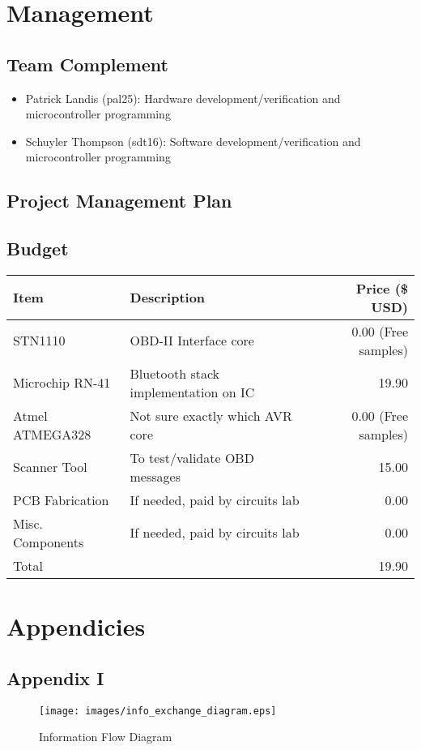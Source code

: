 \documentclass[12pt,letterpaper]{article}
\begin{document}
\section{Management}
\subsection{Team Complement}
\begin{itemize}
	\item Patrick Landis (pal25): Hardware development/verification and microcontroller programming

	\item Schuyler Thompson (sdt16): Software development/verification and microcontroller programming
\end{itemize}

\subsection{Project Management Plan}



\subsection{Budget}
\begin{tabular}{| l | p{7cm} | r |}
\hline
Item & Description & Price (\$ USD) \\ \hline
STN1110 & OBD-II Interface core & 0.00 (Free samples) \\ \hline
Microchip RN-41 & Bluetooth stack implementation on IC & 19.90 \\ \hline
Atmel ATMEGA328 & Not sure exactly which AVR core & 0.00 (Free samples) \\ \hline
Scanner Tool & To test/validate OBD messages & 15.00 \\ \hline
PCB Fabrication & If needed, paid by circuits lab & 0.00 \\ \hline
Misc. Components & If needed, paid by circuits lab & 0.00 \\ \hline
\hline
Total && 19.90 \\ \hline
\end{tabular}

\newpage

\section{Appendicies}
\subsection{Appendix I}
\begin{figure}[!ht]
\centering
\texttt{[image: images/info\_exchange\_diagram.eps]}
\caption{Information Flow Diagram}
\label{fig: image}
\end{figure}
\end{document}

